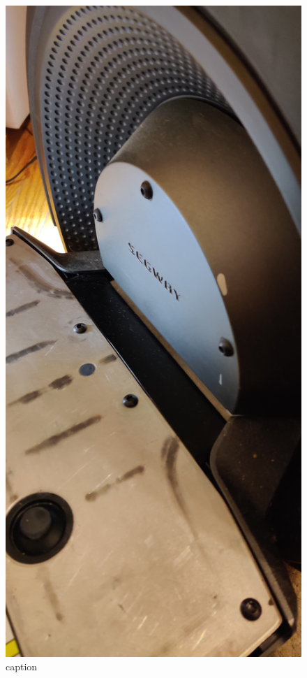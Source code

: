 \documentclass[]{formalLabReport}
\begin{document}
\begin{figure}
    \includegraphics[]{segwayWheelAttachment.jpg}
    \caption{caption}
    \label{fig:segwayWheelAttachment.jpg}
\end{figure}
\end{document}
